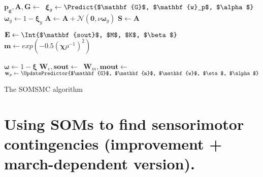 \documentclass[a4paper]{article}
\begin{document}
\begin{algorithm}[H]
{{        \BlankLine
              
    	$\mathbf{p_g}, \mathbf{A},\mathbf{G}\leftarrow$\,\;  
        $\boldsymbol{\xi}_{g}\leftarrow\Predict{$\mathbf{G}$, $\mathbf{w}_p$, $\alpha$}$\;
        $\boldsymbol{\omega}_{g}\leftarrow 1 - \boldsymbol{\xi}_{g}$\;
        $\mathbf{A}\leftarrow\mathbf{A} + \mathcal{N}(\mathbf{0}, \nu\boldsymbol{\omega}_{g})$\; 
        $\mathbf{S}\leftarrow\mathbf{A}$\;
        
        \BlankLine
             

                
        \BlankLine
          
        $\mathbf{E}\leftarrow\Int{$\mathbf{sout}$, $M$, $K$, $\beta$}$\;
		$\mathbf{m} \leftarrow exp(-0.5(\boldsymbol{\chi}\rho^{-1})^2)$\;
                   
        \BlankLine
        $\boldsymbol{\omega}\leftarrow 1-\boldsymbol{\xi}$\;
        $\mathbf{W}_e,\mathbf{sout}\leftarrow$\,\;
        $\mathbf{W}_m,\mathbf{mout}\leftarrow$\,\;       
        $\mathbf{w}_p\leftarrow\UpdatePredictor{$\mathbf{G}$, $\mathbf{m}$, $\mathbf{w}$, $\eta$, $\alpha$}$\;
                            
        \BlankLine
          
    }
}
\caption{The SOMSMC algorithm}\label{smc2}
\end{algorithm}
\DecMargin{1em}

\pagebreak
\section*{Using SOMs to find sensorimotor contingencies (improvement + march-dependent version).}
\end{document}
